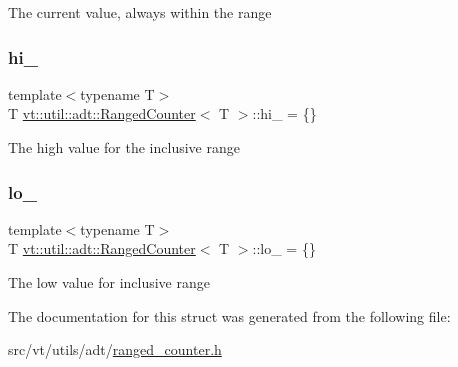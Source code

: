 The current value, always within the range \mbox{\label{structvt_1_1util_1_1adt_1_1_ranged_counter_a453f72e1b6d6bf2bf380bff7fe477c34}} 
\subsubsection{\texorpdfstring{hi\+\_\+}{hi\_}}
{\footnotesize\ttfamily template$<$typename T$>$ \\
T \hyperlink{structvt_1_1util_1_1adt_1_1_ranged_counter}{vt\+::util\+::adt\+::\+Ranged\+Counter}$<$ T $>$\+::hi\+\_\+ = \{\}\hspace{0.3cm}{\ttfamily [private]}}

The high value for the inclusive range \mbox{\label{structvt_1_1util_1_1adt_1_1_ranged_counter_a1463f2ae55747e5b1fae2ee1da281937}} 
\subsubsection{\texorpdfstring{lo\+\_\+}{lo\_}}
{\footnotesize\ttfamily template$<$typename T$>$ \\
T \hyperlink{structvt_1_1util_1_1adt_1_1_ranged_counter}{vt\+::util\+::adt\+::\+Ranged\+Counter}$<$ T $>$\+::lo\+\_\+ = \{\}\hspace{0.3cm}{\ttfamily [private]}}

The low value for inclusive range 

The documentation for this struct was generated from the following file\+:\begin{DoxyCompactItemize}
\item 
src/vt/utils/adt/\hyperlink{ranged__counter_8h}{ranged\+\_\+counter.\+h}\end{DoxyCompactItemize}
